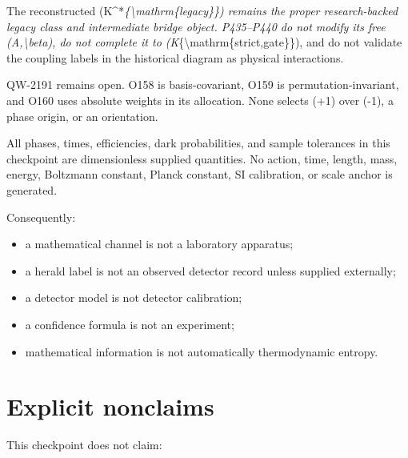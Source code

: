 \documentclass[11pt,a4paper,openany]{report}
\begin{document}
The reconstructed (K\textasciicircum{}*\emph{\{\textbackslash{}mathrm\{legacy\}\}) remains the proper research-backed legacy class and intermediate bridge object. P435--P440 do not modify its free (A,\textbackslash{}beta), do not complete it to (K}\{\textbackslash{}mathrm\{strict,gate\}\}), and do not validate the coupling labels in the historical diagram as physical interactions.

QW-2191 remains open. O158 is basis-covariant, O159 is permutation-invariant, and O160 uses absolute weights in its allocation. None selects (+1) over (-1), a phase origin, or an orientation.

All phases, times, efficiencies, dark probabilities, and sample tolerances in this checkpoint are dimensionless supplied quantities. No action, time, length, mass, energy, Boltzmann constant, Planck constant, SI calibration, or scale anchor is generated.

Consequently:

\begin{itemize}
\item 
a mathematical channel is not a laboratory apparatus;

\item 
a herald label is not an observed detector record unless supplied externally;

\item 
a detector model is not detector calibration;

\item 
a confidence formula is not an experiment;

\item 
mathematical information is not automatically thermodynamic entropy.

\end{itemize}

\chapter{Explicit nonclaims}

This checkpoint does not claim:
\end{document}
